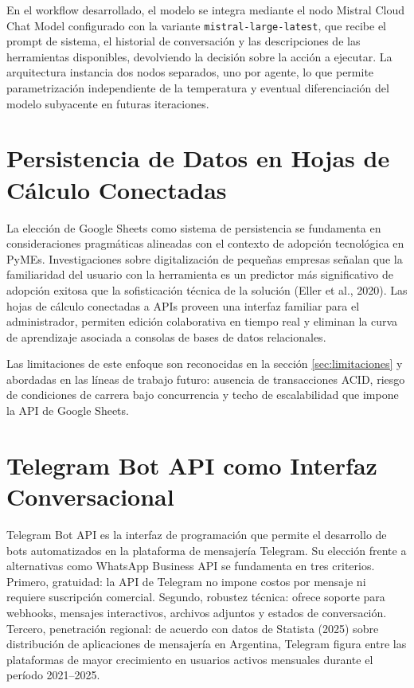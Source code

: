 \documentclass[12pt,a4paper]{report}
\begin{document}
En el workflow desarrollado, el modelo se integra mediante el nodo Mistral Cloud Chat Model configurado con la variante \texttt{mistral-large-latest}, que recibe el prompt de sistema, el historial de conversación y las descripciones de las herramientas disponibles, devolviendo la decisión sobre la acción a ejecutar. La arquitectura instancia dos nodos separados, uno por agente, lo que permite parametrización independiente de la temperatura y eventual diferenciación del modelo subyacente en futuras iteraciones.

\section{Persistencia de Datos en Hojas de Cálculo Conectadas}

La elección de Google Sheets como sistema de persistencia se fundamenta en consideraciones pragmáticas alineadas con el contexto de adopción tecnológica en PyMEs. Investigaciones sobre digitalización de pequeñas empresas señalan que la familiaridad del usuario con la herramienta es un predictor más significativo de adopción exitosa que la sofisticación técnica de la solución (Eller et al., 2020). Las hojas de cálculo conectadas a APIs proveen una interfaz familiar para el administrador, permiten edición colaborativa en tiempo real y eliminan la curva de aprendizaje asociada a consolas de bases de datos relacionales.

Las limitaciones de este enfoque son reconocidas en la sección \ref{sec:limitaciones} y abordadas en las líneas de trabajo futuro: ausencia de transacciones ACID, riesgo de condiciones de carrera bajo concurrencia y techo de escalabilidad que impone la API de Google Sheets.

\section{Telegram Bot API como Interfaz Conversacional}

Telegram Bot API es la interfaz de programación que permite el desarrollo de bots automatizados en la plataforma de mensajería Telegram. Su elección frente a alternativas como WhatsApp Business API se fundamenta en tres criterios. Primero, gratuidad: la API de Telegram no impone costos por mensaje ni requiere suscripción comercial. Segundo, robustez técnica: ofrece soporte para webhooks, mensajes interactivos, archivos adjuntos y estados de conversación. Tercero, penetración regional: de acuerdo con datos de Statista (2025) sobre distribución de aplicaciones de mensajería en Argentina, Telegram figura entre las plataformas de mayor crecimiento en usuarios activos mensuales durante el período 2021--2025.
\end{document}
